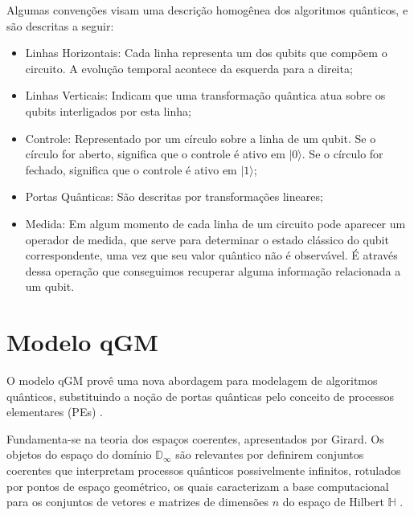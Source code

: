 \documentclass[tcc,capa]{texufpel}
\begin{document}
Algumas convenções visam uma descrição homogênea dos algoritmos quânticos, e são descritas a seguir:
\begin{itemize}
\item[\textendash] Linhas Horizontais: Cada linha representa um dos qubits que compõem o circuito. A evolução temporal acontece da esquerda para a direita;
\item[\textendash] Linhas Verticais: Indicam que uma transformação quântica atua sobre os qubits interligados por esta linha;
\item[\textendash] Controle: Representado por um círculo sobre a linha de um qubit. Se o círculo for aberto, significa que o controle é ativo em $|0\rangle$. Se o círculo for fechado, significa que o controle é ativo em $|1\rangle$;
\item[\textendash] Portas Quânticas: São descritas por transformações lineares;
\item[\textendash] Medida: Em algum momento de cada linha de um circuito pode aparecer um operador de medida, que serve para determinar o estado clássico do qubit correspondente, uma vez que seu valor quântico não é observável. É através dessa operação que conseguimos recuperar alguma informação relacionada a um qubit.
\end{itemize}





\section{Modelo qGM}
O modelo qGM provê uma nova abordagem para modelagem de algoritmos quânticos, substituindo a noção de portas quânticas pelo conceito de processos elementares (PEs) \cite{Schmalfuss14}.

Fundamenta-se na teoria dos espaços coerentes, apresentados por Girard. Os objetos do espaço do domínio $\mathbb{D}_\infty$ são relevantes por definirem conjuntos coerentes que interpretam processos quânticos possivelmente infinitos, rotulados por pontos de espaço geométrico, os quais caracterizam a base computacional para os conjuntos de vetores e matrizes de dimensões $n$ do espaço de Hilbert $\mathbb{H}$ \cite{maron:2013:ccgrid}.
\end{document}

